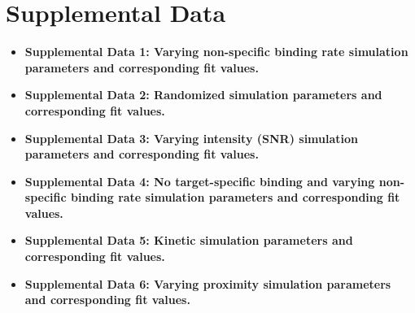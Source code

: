 \section{Supplemental Data}

\begin{itemize}
    \item \textbf{Supplemental Data 1: Varying non-specific binding rate simulation parameters and corresponding fit values.}

    \item \textbf{Supplemental Data 2: Randomized simulation parameters and corresponding fit values.}

    \item \textbf{Supplemental Data 3: Varying intensity (SNR) simulation parameters and corresponding fit values.}

    \item \textbf{Supplemental Data 4: No target-specific binding and varying non-specific binding rate simulation parameters and corresponding fit values.}

    \item \textbf{Supplemental Data 5: Kinetic simulation parameters and corresponding fit values.}
    
    \item \textbf{Supplemental Data 6: Varying proximity simulation parameters and corresponding fit values.}
\end{itemize}